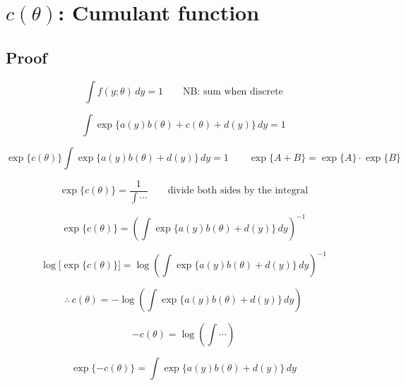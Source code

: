 \documentclass[12pt]{article}
\begin{document}
\section*{$c(\theta)$: Cumulant function}

\subsection*{Proof}

\[
\int f(y;\theta)\, dy = 1 \qquad \text{NB: sum when discrete}
\]

\[
\int \exp\{a(y)b(\theta) + c(\theta) + d(y)\}\, dy = 1
\]

\[
\exp\{c(\theta)\} \int \exp\{a(y)b(\theta) + d(y)\}\, dy = 1
\qquad \exp\{A+B\} = \exp\{A\}\cdot\exp\{B\}
\]

\[
\exp\{c(\theta)\} = \frac{1}{\int \cdots}
\qquad \text{divide both sides by the integral}
\]

\[
\exp\{c(\theta)\} = \left( \int \exp\{a(y)b(\theta) + d(y)\}\, dy \right)^{-1}
\]

\[
\log\big[\exp\{c(\theta)\}\big] = \log\left( \int \exp\{a(y)b(\theta) + d(y)\}\, dy \right)^{-1}
\]

\[
\therefore\ c(\theta) = -\log\left( \int \exp\{a(y)b(\theta) + d(y)\}\, dy \right)
\]

\[
-c(\theta) = \log\left( \int \cdots \right)
\]

\[
\exp\{-c(\theta)\} = \int \exp\{a(y)b(\theta) + d(y)\}\, dy
\]
\end{document}
